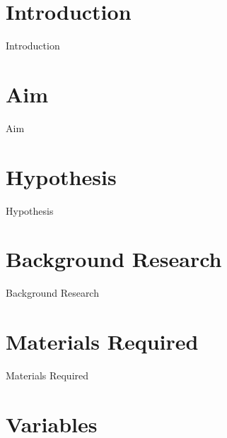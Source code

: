\documentclass[12pt, a4paper]{report}
\begin{document}
\maketitle

\tableofcontents
\clearpage







\setlength{\parindent}{20pt}



\chapter{{Introduction}}
        
        {Introduction}       
        
\chapter{{Aim}}
        
        {Aim}

\chapter{{Hypothesis}}
        
        {Hypothesis}    
        
\chapter{{Background Research}}
        
        {Background Research}
        
\chapter{{Materials Required}}
        
        {Materials Required}
        
\chapter{{Variables}}
        
\end{document}
